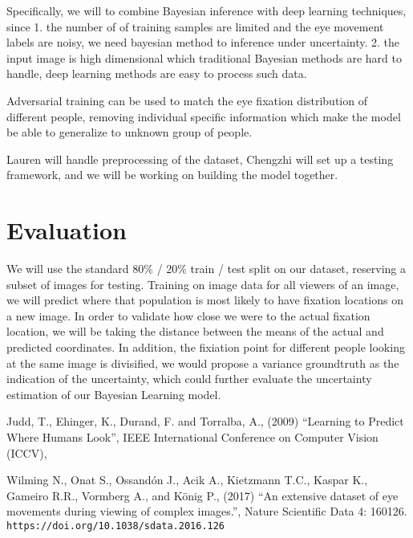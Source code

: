 \documentclass[11pt]{article}
\begin{document}
Specifically, we will to combine Bayesian inference with deep learning techniques,
since 1. the number of of training samples are limited and the eye movement labels are noisy, we need bayesian method to
inference under uncertainty. 2. the input image is high dimensional which traditional Bayesian methods are hard to handle,
deep learning methods are easy to process such data.

Adversarial training can be used to match the eye fixation distribution of different people, removing
individual specific information which make the model be able to generalize to unknown group of people.

Lauren will handle preprocessing of the dataset, Chengzhi will set up a testing
framework, and we will be working on building the model together. 
\vspace{-0.5cm}

\section{Evaluation}
We will use the standard 80\% / 20\% train / test split on our dataset,
reserving a subset of images for testing. Training on image data for all viewers of
an image, we will predict where that population is most likely to have fixation
locations on a new image. In order to validate how close we were to the actual
fixation location, we will be taking the distance between the means of the
actual and predicted coordinates. In addition, the fixiation point for different 
people looking at the same image is divisified, we would propose a variance groundtruth
as the indication of the uncertainty, which could further evaluate the uncertainty estimation
of our Bayesian Learning model.



\vspace{-0.25cm}


\begin{thebibliography}{99}
      Judd, T., Ehinger, K., Durand, F. and Torralba, A.,
      (2009)
      ``Learning to Predict Where Humans Look'',
      IEEE International Conference on Computer Vision (ICCV),

     Wilming N., Onat S., Ossandón J., Acik A., Kietzmann
    T.C., Kaspar K., Gameiro R.R., Vormberg A., and König P., (2017)
    ``An extensive dataset of eye movements during viewing of complex
    images.'', Nature Scientific Data 4: 160126.  \verb|https://doi.org/10.1038/sdata.2016.126|

\end{thebibliography}
\end{document}
